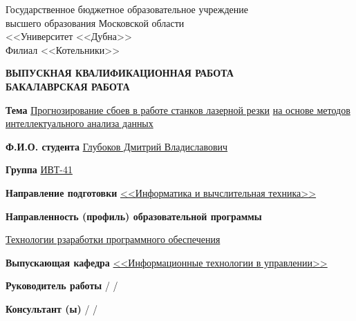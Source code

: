 \begin{titlepage}
\newpage

\begin{center}
Государственное бюджетное образовательное учреждение \\
высшего образования Московской области \\
<<Университет <<Дубна>> \\
Филиал <<Котельники>> \\
\end{center}

\vspace{2em}

\begin{center}
\textbf{ВЫПУСКНАЯ КВАЛИФИКАЦИОННАЯ РАБОТА} \\
\textbf{БАКАЛАВРСКАЯ РАБОТА}
\end{center}

\vspace{2em}

\begin{center}
\textbf{Тема} \underline{Прогнозирование сбоев в работе станков лазерной резки}
\underline{ на основе методов интеллектуального анализа данных}
\end{center}



\begin{flushleft}
\textbf{Ф.И.О. студента} \underline{Глубоков Дмитрий Владиславович}

\textbf{Группа} \underline{ИВТ-41}

\textbf{Направление подготовки} \underline{<<Информатика и вычслительная техника>>}

\textbf{Направленность (профиль) образовательной программы}

\underline{Технологии рзаработки программного обеспечения}

\vspace{1em}

\textbf{Выпускающая кафедра} \underline{<<Информационные технологии в управлении>>}

\vspace{2em}

\textbf{Руководитель работы}
\hspace{10pt}
\hrulefill
\hspace{5pt}
/
\hspace{2pt}
\hrulefill
\hspace{2pt}
/

\textbf{Консультант (ы)}
\hspace{43pt}
\hrulefill
\hspace{5pt}
/
\hspace{2pt}
\hrulefill
\hspace{2pt}
/


\end{flushleft}
\end{titlepage}
